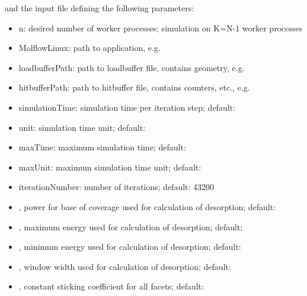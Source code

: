 and the input file defining the following parameters:
\begin{itemize}[noitemsep,topsep=0pt]
\item n: desired number of worker processes; simulation on K=N-1 worker processes
\item MolflowLinux: path to application, e.g.\ 
\item loadbufferPath: path to loadbuffer file, contains geometry, e.g.\ 
\item hitbufferPath: path to hitbuffer file, contains counters, etc., e.g.\ 
\item simulationTime: simulation time per iteration step; default: 
\item unit: simulation time unit; default: 
\item maxTime: maximum simulation time; default: 
\item maxUnit: maximum simulation time unit; default: 
\item iterationNumber: number of iterations; default: 43200
\item{}, power for base of coverage used for calculation of desorption; default:
\item {}, maximum energy used for calculation of desorption; default:
\item {}, minimum energy used for calculation of desorption; default:
\item {}, window width used for calculation of desorption; default:
\item {}, constant sticking coefficient for all facets; default:
\end{itemize}

